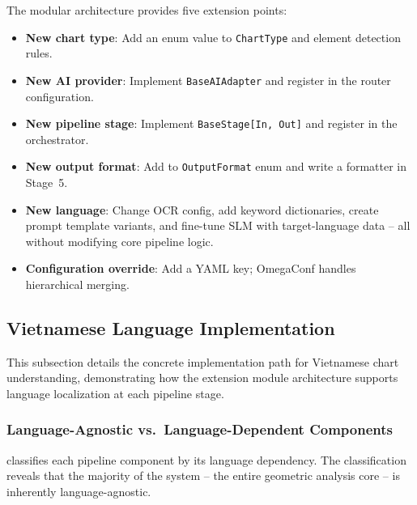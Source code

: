 The modular architecture provides five extension points:
\begin{itemize}
    \item \textbf{New chart type}: Add an enum value to \texttt{ChartType} and element
          detection rules.
    \item \textbf{New AI provider}: Implement \texttt{BaseAIAdapter} and register in the
          router configuration.
    \item \textbf{New pipeline stage}: Implement \texttt{BaseStage[In, Out]} and register
          in the orchestrator.
    \item \textbf{New output format}: Add to \texttt{OutputFormat} enum and write a
          formatter in Stage~5.
    \item \textbf{New language}: Change OCR config, add keyword dictionaries, create
          prompt template variants, and fine-tune SLM with target-language data --
          all without modifying core pipeline logic.
    \item \textbf{Configuration override}: Add a YAML key; OmegaConf handles hierarchical
          merging.
\end{itemize}

\subsection{Vietnamese Language Implementation}
\label{sec:viet_impl}

This subsection details the concrete implementation path for Vietnamese chart
understanding, demonstrating how the extension module architecture supports language
localization at each pipeline stage.

\subsubsection{Language-Agnostic vs.\ Language-Dependent Components}

 classifies each pipeline component by its language dependency.
The classification reveals that the majority of the system -- the entire geometric
analysis core -- is inherently language-agnostic.

